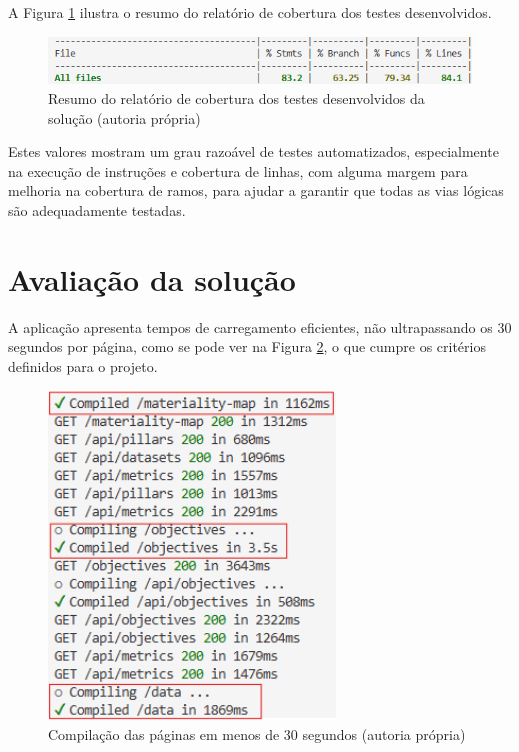 A Figura \ref{fig:coverage} ilustra o resumo do relatório de cobertura dos testes desenvolvidos. 

\begin{figure}[H]
    \centering
    \includegraphics[width=\linewidth,keepaspectratio]{frontmatter/assets/tests/coverage.png}
    \caption{Resumo do relatório de cobertura dos testes desenvolvidos da solução (autoria própria)}
    \label{fig:coverage}
\end{figure}

Estes valores mostram um grau razoável de testes automatizados, especialmente na execução de instruções e cobertura de linhas, com alguma margem para melhoria na cobertura de ramos, para ajudar a garantir que todas as vias lógicas são adequadamente testadas.

\section{Avaliação da solução} 

A aplicação apresenta tempos de carregamento eficientes, não ultrapassando os 30 segundos por página, como se pode ver na Figura \ref{fig:page_compiling}, o que cumpre os critérios definidos para o projeto.

\begin{figure}[H]
    \centering
    \includegraphics[width=3in,keepaspectratio]{frontmatter/assets/compiling/pages_time.png}
    \caption{Compilação das páginas em menos de 30 segundos (autoria própria)}
    \label{fig:page_compiling}
\end{figure}

